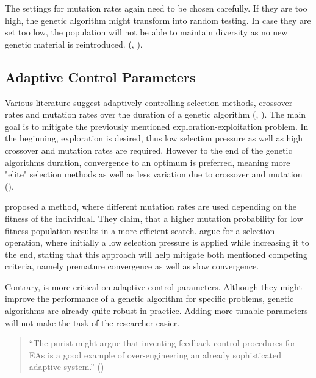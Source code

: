 The settings for mutation rates again need to be chosen carefully. If they are too high, the genetic algorithm might transform into random testing. In case they are set too low, the population will not be able to maintain diversity as no new genetic material is reintroduced. (\cite{klampfl_using_nodate}, \cite{grefenstette_optimization_1986}).

\subsection{Adaptive Control Parameters}
Various literature suggest adaptively controlling selection methods, crossover rates and mutation rates over the duration of a genetic algorithm (\cite{marsili_libelli_adaptive_2000}, ). The main goal is to mitigate the previously mentioned exploration-exploitation problem. In the beginning, exploration is desired, thus low selection pressure as well as high crossover and mutation rates are required. However to the end of the genetic algorithms duration, convergence to an optimum is preferred, meaning more "elite" selection methods as well as less variation due to crossover and mutation (\cite{srinivas_genetic_1994}).

\cite{marsili_libelli_adaptive_2000} proposed a method, where different mutation rates are used depending on the fitness of the individual. They claim, that a higher mutation probability for low fitness population results in a more efficient search. \cite{hussain_trade-off_2020} argue for a selection operation, where initially a low selection pressure is applied while increasing it to the end, stating that this approach will help mitigate both mentioned competing criteria, namely premature convergence as well as slow convergence.

Contrary, \cite{kacprzyk_parameter_2007} is more critical on adaptive control parameters. Although they might improve the performance of a genetic algorithm for specific problems, genetic algorithms are already quite robust in practice. Adding more tunable parameters will not make the task of the researcher easier.

\begin{quote}
	\begin{em}
		\enquote{The purist might argue that inventing feedback control procedures for EAs is a good example of over-engineering an already sophisticated adaptive system.} (\cite{kacprzyk_parameter_2007})
	\end{em}
\end{quote}

